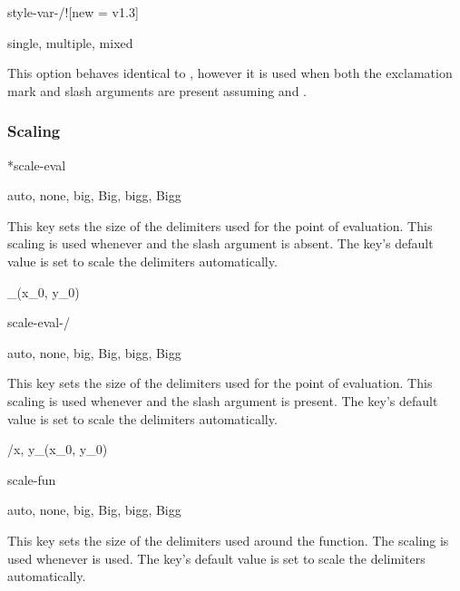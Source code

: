 \begin{option}{style-var-/!}[new = v1.3]
	\begin{values}[default = single]
		single, multiple, mixed
	\end{values}
	This option behaves identical to , however it is used when both the exclamation mark and slash arguments are present assuming  and .
\end{option}

\subsubsection*{Scaling}

\begin{option}*{scale-eval}
	\begin{values}[default = auto]
		auto, none, big, Big, bigg, Bigg
	\end{values}
	This key sets the size of the delimiters used for the point of evaluation. This scaling is used whenever  and the slash argument is absent. The key's default value is set to scale the delimiters automatically.
	\begin{example}
		_{(x_0, y_0)}
	\end{example}
\end{option}

\begin{option}{scale-eval-/}
	\begin{values}[default = auto]
		auto, none, big, Big, bigg, Bigg
	\end{values}
	This key sets the size of the delimiters used for the point of evaluation. This scaling is used whenever  and the slash argument is present. The key's default value is set to scale the delimiters automatically.
	\begin{example}
		/{x, y}_{(x_0, y_0)}
	\end{example}
\end{option}

\begin{option}{scale-fun}
	\begin{values}[default = auto]
		auto, none, big, Big, bigg, Bigg
	\end{values}
	This key sets the size of the delimiters used around the function. The scaling is used whenever  is used. The key's default value is set to scale the delimiters automatically.
	\begin{example}
		\pdv[scale-fun=big, fun]{f}{x, y}
	\end{example}
\end{option}

